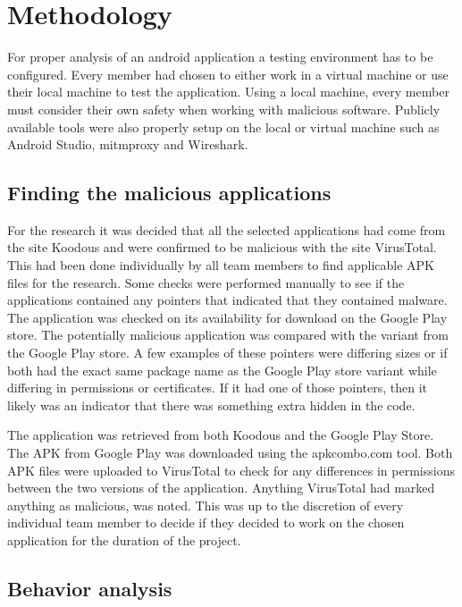 \section{Methodology}

For proper analysis of an android application a testing environment has to be configured.
Every member had chosen to either work in a virtual machine or use their local machine to test the application.
Using a local machine, every member must consider their own safety when working with malicious software.
Publicly available tools were also properly setup on the local or virtual machine such as Android Studio, mitmproxy and Wireshark.

\subsection{Finding the malicious applications}

For the research it was decided that all the selected applications had come from the site Koodous and were confirmed to be malicious with the site VirusTotal.
This had been done individually by all team members to find applicable APK files for the research.
Some checks were performed manually to see if the applications contained any pointers that indicated that they contained malware.
The application was checked on its availability for download on the Google Play store.
The potentially malicious application was compared with the variant from the Google Play store.
A few examples of these pointers were differing sizes or if both had the exact same package name as the Google Play store variant while differing in permissions or certificates.
If it had one of those pointers, then it likely was an indicator that there was something extra hidden in the code.

The application was retrieved from both Koodous and the Google Play Store.
The APK from Google Play was downloaded using the apkcombo.com tool.
Both APK files were uploaded to VirusTotal to check for any differences in permissions between the two versions of the application.
Anything VirusTotal had marked anything as malicious, was noted.
This was up to the discretion of every individual team member to decide if they decided to work on the chosen application for the duration of the project.

\subsection{Behavior analysis}

